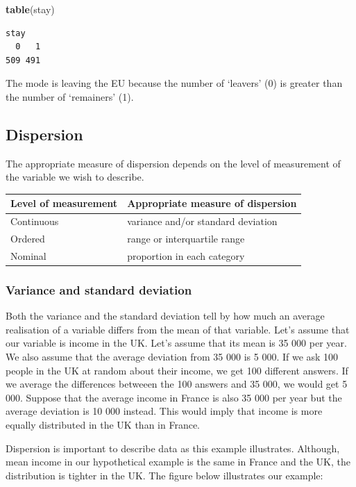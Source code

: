 \documentclass[]{book}
\newenvironment{Shaded}{\begin{snugshade}}{\end{snugshade}}
\newcommand{\KeywordTok}[1]{\textcolor[rgb]{0.13,0.29,0.53}{\textbf{#1}}}
\newcommand{\NormalTok}[1]{#1}
\theoremstyle{definition}
\theoremstyle{definition}
\theoremstyle{definition}
\theoremstyle{remark}
\begin{document}
\begin{Shaded}
\begin{Highlighting}[]
\KeywordTok{table}\NormalTok{(stay)}
\end{Highlighting}
\end{Shaded}

\begin{verbatim}
stay
  0   1 
509 491 
\end{verbatim}

The mode is leaving the EU because the number of `leavers' (0) is
greater than the number of `remainers' (1).

\subsection{Dispersion}\label{dispersion}

The appropriate measure of dispersion depends on the level of
measurement of the variable we wish to describe.

\begin{longtable}[]{@{}ll@{}}
\toprule
Level of measurement & Appropriate measure of dispersion\tabularnewline
\midrule
\endhead
Continuous & variance and/or standard deviation\tabularnewline
Ordered & range or interquartile range\tabularnewline
Nominal & proportion in each category\tabularnewline
\bottomrule
\end{longtable}

\subsubsection{Variance and standard
deviation}\label{variance-and-standard-deviation}

Both the variance and the standard deviation tell by how much an average
realisation of a variable differs from the mean of that variable. Let's
assume that our variable is income in the UK. Let's assume that its mean
is 35 000 per year. We also assume that the average deviation from 35
000 is 5 000. If we ask 100 people in the UK at random about their
income, we get 100 different answers. If we average the differences
betweeen the 100 answers and 35 000, we would get 5 000. Suppose that
the average income in France is also 35 000 per year but the average
deviation is 10 000 instead. This would imply that income is more
equally distributed in the UK than in France.

Dispersion is important to describe data as this example illustrates.
Although, mean income in our hypothetical example is the same in France
and the UK, the distribution is tighter in the UK. The figure below
illustrates our example:
\end{document}

